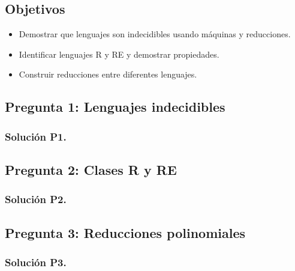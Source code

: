 \documentclass{article}
\begin{document}
\subsection*{Objetivos}
\begin{itemize}
    \item Demostrar que lenguajes son indecidibles usando máquinas y reducciones.
    \item Identificar lenguajes R y RE y demostrar propiedades.
    \item Construir reducciones entre diferentes lenguajes.
\end{itemize}

\subsection*{Pregunta 1: Lenguajes indecidibles}


\subsubsection*{Solución P1.}

\newpage
\subsection*{Pregunta 2: Clases R y RE}


\subsubsection*{Solución P2.}


\newpage
\subsection*{Pregunta 3: Reducciones polinomiales}


\subsubsection*{Solución P3.}

\end{document}
